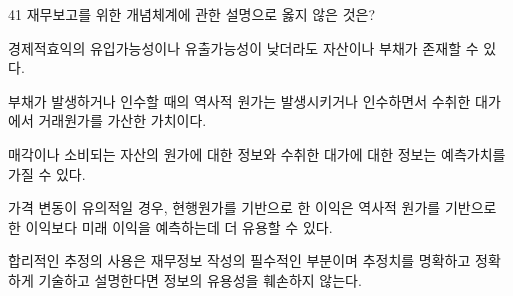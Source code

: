 \begin{question}{41}
재무보고를 위한 개념체계에 관한 설명으로 옳지 않은 것은?
\begin{choices}
  \item 경제적효익의 유입가능성이나 유출가능성이 낮더라도 자산이나 부채가 존재할 수 있다.
  \item 부채가 발생하거나 인수할 때의 역사적 원가는 발생시키거나 인수하면서 수취한 대가에서 거래원가를 가산한 가치이다.
  \item 매각이나 소비되는 자산의 원가에 대한 정보와 수취한 대가에 대한 정보는 예측가치를 가질 수 있다.
  \item 가격 변동이 유의적일 경우, 현행원가를 기반으로 한 이익은 역사적 원가를 기반으로 한 이익보다 미래 이익을 예측하는데 더 유용할 수 있다.
  \item 합리적인 추정의 사용은 재무정보 작성의 필수적인 부분이며 추정치를 명확하고 정확하게 기술하고 설명한다면 정보의 유용성을 훼손하지 않는다.
\end{choices}
\end{question}
